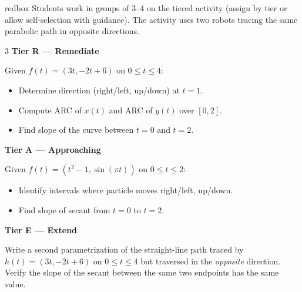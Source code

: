 \documentclass[10pt]{article}
\begin{document}
\vspace{0.08in}

\begin{skillbox}{redbox}
Students work in groups of 3--4 on the tiered activity (assign by tier
or allow self-selection with guidance). The activity uses two robots
tracing the same parabolic path in opposite directions.

\begin{multicols}{3}
\textbf{Tier R --- Remediate}

Given $f(t) = (3t, -2t + 6)$ on $0 \le t \le 4$:
\begin{itemize}[leftmargin=1em, itemsep=2pt]
  \item Determine direction (right/left, up/down) at $t = 1$.
  \item Compute ARC of $x(t)$ and ARC of $y(t)$ over $[0, 2]$.
  \item Find slope of the curve between $t = 0$ and $t = 2$.
\end{itemize}

\columnbreak
\textbf{Tier A --- Approaching}

Given $f(t) = (t^2 - 1, \sin(\pi t))$ on $0 \le t \le 2$:
\begin{itemize}[leftmargin=1em, itemsep=2pt]
  \item Identify intervals where particle moves right/left, up/down.
  \item Find slope of secant from $t = 0$ to $t = 2$.
\end{itemize}

\columnbreak
\textbf{Tier E --- Extend}

Write a second parametrization of the straight-line path traced by
$h(t) = (3t, -2t + 6)$ on $0 \le t \le 4$ but traversed in the
\emph{opposite} direction. Verify the slope of the secant
between the same two endpoints has the same value.
\end{multicols}
\end{skillbox}

\vspace{0.08in}
\end{document}
